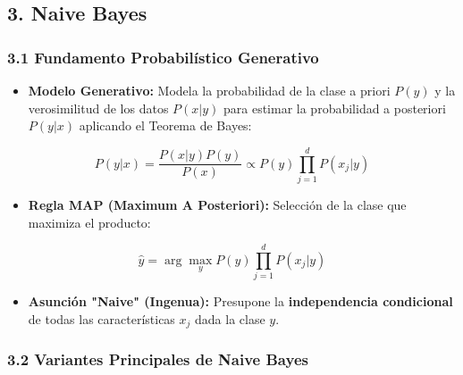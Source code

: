 \documentclass[11pt,oneside]{article}
\begin{document}
\subsection{3. Naive Bayes}

\subsubsection{3.1 Fundamento Probabilístico Generativo}

\begin{itemize}

\item \textbf{Modelo Generativo:} Modela la probabilidad de la clase a priori \(P(y)\) y la verosimilitud de los datos \(P(x\vert{}y)\) para estimar la probabilidad a posteriori \(P(y\vert{}x)\) aplicando el Teorema de Bayes:

\end{itemize}

\[P(y\vert{}x) = \frac{P(x\vert{}y)P(y)}{P(x)} \propto P(y) \prod_{j=1}^{d} P(x_j\vert{}y)\]

\begin{itemize}

\item \textbf{Regla MAP (Maximum A Posteriori):} Selección de la clase que maximiza el producto: 

\end{itemize}

\[\hat{y} = \arg\max_{y} P(y) \prod_{j=1}^{d} P(x_j\vert{}y)\]

\begin{itemize}

\item \textbf{Asunción "Naive" (Ingenua):} Presupone la \textbf{independencia condicional} de todas las características \(x_j\) dada la clase \(y\).

\end{itemize}

\subsubsection{3.2 Variantes Principales de Naive Bayes}
\end{document}
